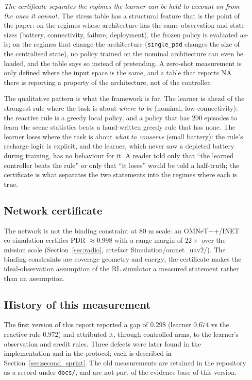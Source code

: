 \emph{The certificate separates the regimes the learner can be held to
account on from the ones it cannot.}  The stress table has a structural
feature that is the point of the paper: on the regimes whose architecture
has the same observation and state sizes (battery, connectivity, failure,
deployment), the frozen policy is evaluated as-is; on the regimes that
change the architecture (\texttt{single\_pad} changes the size of the
centralised state), no policy trained on the nominal architecture can even
be loaded, and the table says so instead of pretending.  A zero-shot
measurement is only defined where the input space is the same, and a table
that reports NA there is reporting a property of the architecture, not of
the controller.



The qualitative pattern is what the framework is for.  The learner is ahead
of the strongest rule where the task is about \emph{where to be} (nominal,
low connectivity): the reactive rule is a greedy local policy, and a policy
that has 200 episodes to learn the scene statistics beats a hand-written
greedy rule that has none.  The learner loses where the task is about
\emph{what to conserve} (small battery): the rule's recharge logic is
explicit, and the learner, which never saw a depleted battery during
training, has no behaviour for it.  A reader told only that ``the learned
controller beats the rule'' or only that ``it loses'' would be told a
half-truth; the certificate is what separates the two statements into the
regimes where each is true.

\subsection{Network certificate}
\label{sec:results_network}

The network is not the binding constraint at 80 m scale: an OMNeT++/INET
co-simulation certifies PDR $\approx 0.998$ with a range margin of $22\times$
over the mission scale (Section~\ref{sec:radio}, artefact
Simulation/omnet_uav2/).  The binding constraints are coverage geometry and
energy; the certificate makes the ideal-observation assumption of the RL
simulator a measured statement rather than an assumption.

\subsection{History of this measurement}
\label{sec:history}

The first version of this report reported a gap of $0.298$ (learner $0.674$
vs the reactive rule $0.972$) and attributed it, through controlled arms, to
the learner's observation and credit rules.  Three defects were later found
in the implementation and in the protocol; each is described in
Section~\ref{sec:second_sprint}.  The old measurements are retained in the
repository as a record under \texttt{docs/}, and are not part of the evidence
base of this version.